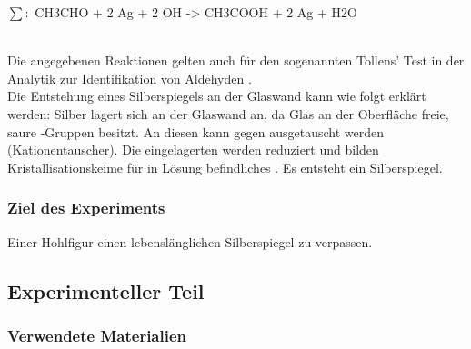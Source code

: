 \documentclass{article}
\begin{document}
        \begin{reactions}
          $\sum :$ CH3CHO\aq{} + 2 Ag\pch\aq{} + 2 OH\mch\aq{} -> CH3COOH\aq{} + 2 Ag\sld{} + H2O
        \end{reactions} \\
        
        Die angegebenen Reaktionen gelten auch für den sogenannten Tollens' Test in der Analytik zur Identifikation von Aldehyden \cite{Tollenstest}. \\
        
        Die Entstehung eines Silberspiegels an der Glaswand kann wie folgt erklärt werden: Silber lagert sich an der Glaswand an, da Glas an der Oberfläche freie, saure -Gruppen besitzt. An diesen kann  gegen  ausgetauscht werden (Kationentauscher). Die eingelagerten  werden reduziert und bilden Kristallisationskeime für in Lösung befindliches .  Es entsteht ein Silberspiegel.
      
      \subsubsection{Ziel des Experiments}
      
        Einer Hohlfigur einen lebenslänglichen Silberspiegel zu verpassen.
    
    \subsection{Experimenteller Teil}
    
      \subsubsection{Verwendete Materialien}
        
\end{document}
